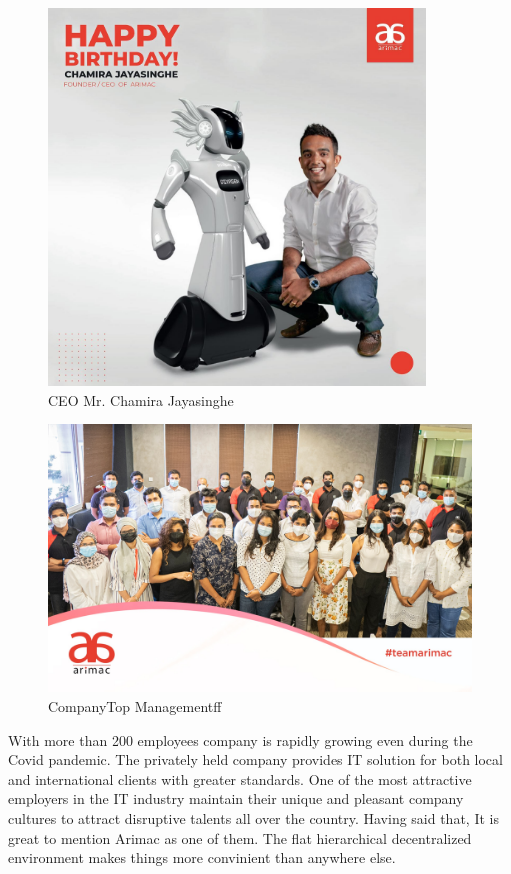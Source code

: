 \documentclass[twoside,12pt,times,onecolumn,a4paper]{report}
\begin{document}
\begin{figure}[!h]
  \centering
   \includegraphics[width=10cm]{ceo}
  \caption{CEO Mr. Chamira Jayasinghe}
\end{figure}

\begin{figure}[H]
  \centering
   \includegraphics[width=12cm]{staff}
  \caption{CompanyTop Managementff}
\end{figure}

With more than 200 employees company is rapidly growing even during the Covid pandemic. The privately held company provides IT solution for both local and international clients with greater standards. One of the most attractive employers in the IT industry maintain their unique and pleasant company cultures to attract disruptive talents all over the country. Having said that, It is great to mention Arimac as one of them. The flat hierarchical decentralized environment makes things more convinient than anywhere else. 
\end{document}
